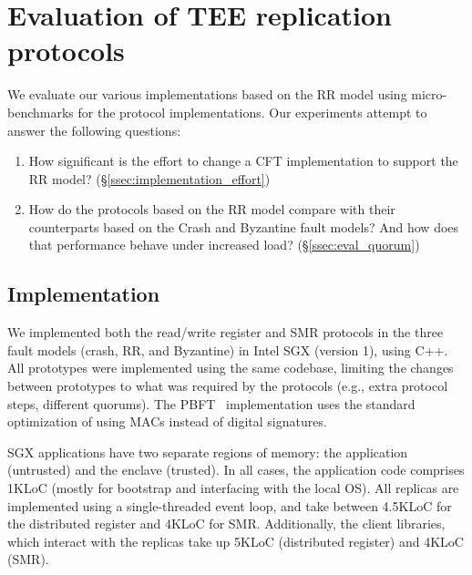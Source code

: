 \section{Evaluation of \ac{TEE} replication protocols}

We evaluate our various implementations based on the \ac{RR}
model using micro-benchmarks for the protocol implementations. Our
experiments attempt to answer the following questions:

\begin{enumerate}
    \item How significant is the effort to change a \ac{CFT}
        implementation to support the \ac{RR} model?
        (\S\ref{ssec:implementation_effort})
    \item How do the protocols based on the \ac{RR} model
      compare with their counterparts based on the Crash and Byzantine
      fault models? And how does that performance behave under increased load?  (\S\ref{ssec:eval_quorum})
\end{enumerate}

\subsection{Implementation}\label{ssec:impl}

We implemented both the read/write register and SMR protocols in
the three fault models (crash, \ac{RR}, and Byzantine) in Intel
SGX (version 1), using C++. All prototypes were implemented using
the same codebase, limiting the changes between prototypes to
what was required by the protocols (e.g., extra protocol steps,
different quorums). The PBFT~\cite{pbft} implementation uses the
standard optimization of using MACs instead of digital
signatures.

SGX applications have two separate regions of memory: the
application (untrusted) and the enclave (trusted). In all cases,
the application code comprises 1KLoC (mostly for bootstrap and
interfacing with the local \ac{OS}). All replicas are implemented
using a single-threaded event loop, and take between 4.5KLoC for
the distributed register and 4KLoC for \ac{SMR}. Additionally, the client libraries, which
interact with the replicas take up 5KLoC (distributed
register) and 4KLoC (\ac{SMR}).


